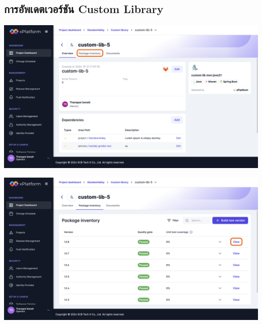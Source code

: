 \subsection{การอัพเดตเวอร์ชัน Custom Library}
\begin{center}
    \includegraphics[width=\linewidth]{resources/pages/custom-library/update-library/6.png}

    \vspace{1in}

    \includegraphics[width=\linewidth]{resources/pages/custom-library/update-library/7.png}
\end{center}

